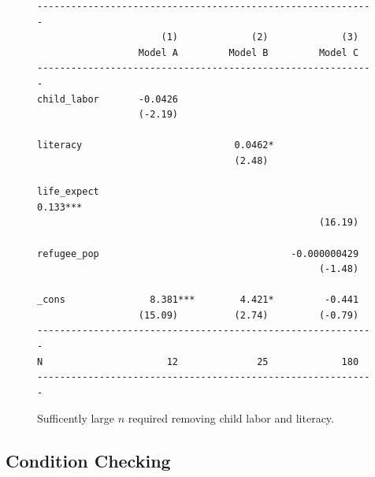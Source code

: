 \documentclass[11pt]{article}
\begin{document}
\begin{figure}[!ht]
\begin{singlespace}
\small
\begin{verbatim}
------------------------------------------------------------
                      (1)             (2)             (3)
                  Model A         Model B         Model C
------------------------------------------------------------
child_labor       -0.0426
                  (-2.19)

literacy                           0.0462*
                                   (2.48)

life_expect                                         0.133***
                                                  (16.19)

refugee_pop                                  -0.000000429
                                                  (-1.48)

_cons               8.381***        4.421*         -0.441
                  (15.09)          (2.74)         (-0.79)
------------------------------------------------------------
N                      12              25             180
------------------------------------------------------------
\end{verbatim}
\end{singlespace}
\caption{\label{social_development_model_regressions}Sufficently large $n$ required removing child labor and literacy.}
\end{figure}

\subsection{Condition Checking}



















\end{document}
